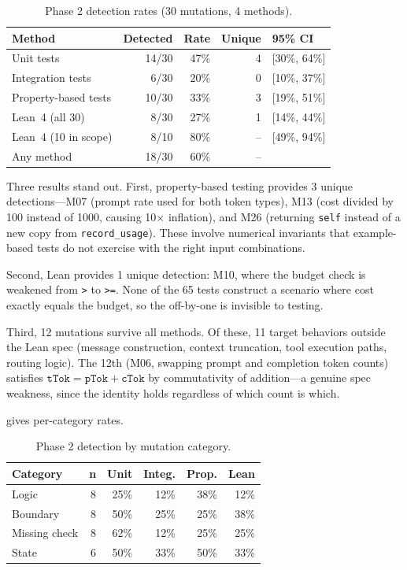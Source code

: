 \documentclass[11pt,a4paper]{article}
\begin{document}
\begin{table}[htbp]
\centering
\caption{Phase 2 detection rates (30 mutations, 4 methods).}
\label{tab:phase2}
\small
\begin{tabular}{@{}lrrrl@{}}
\toprule
\textbf{Method} & \textbf{Detected} & \textbf{Rate} & \textbf{Unique} & \textbf{95\% CI} \\
\midrule
Unit tests & 14/30 & 47\% & 4 & [30\%, 64\%] \\
Integration tests & 6/30 & 20\% & 0 & [10\%, 37\%] \\
Property-based tests & 10/30 & 33\% & 3 & [19\%, 51\%] \\
Lean~4 (all 30) & 8/30 & 27\% & 1 & [14\%, 44\%] \\
Lean~4 (10 in scope) & 8/10 & 80\% & -- & [49\%, 94\%] \\
\midrule
Any method & 18/30 & 60\% & -- & \\
\bottomrule
\end{tabular}
\end{table}

Three results stand out. First, property-based testing provides
3 unique detections---M07 (prompt rate used for both token types),
M13 (cost divided by 100 instead of 1000, causing 10$\times$
inflation), and M26 (returning \texttt{self} instead of a new copy
from \texttt{record\_usage}). These involve numerical invariants
that example-based tests do not exercise with the right input
combinations.

Second, Lean provides 1 unique detection: M10, where the budget
check is weakened from \texttt{>} to \texttt{>=}. None of the
65 tests construct a scenario where cost exactly equals the budget,
so the off-by-one is invisible to testing.

Third, 12 mutations survive all methods. Of these, 11 target
behaviors outside the Lean spec (message construction, context
truncation, tool execution paths, routing logic). The 12th (M06,
swapping prompt and completion token counts) satisfies
$\texttt{tTok} = \texttt{pTok} + \texttt{cTok}$ by commutativity
of addition---a genuine spec weakness, since the identity holds
regardless of which count is which.

 gives per-category rates.

\begin{table}[htbp]
\centering
\caption{Phase 2 detection by mutation category.}
\label{tab:categories}
\small
\begin{tabular}{@{}lrrrrr@{}}
\toprule
\textbf{Category} & \textbf{n} & \textbf{Unit} & \textbf{Integ.} & \textbf{Prop.} & \textbf{Lean} \\
\midrule
Logic & 8 & 25\% & 12\% & 38\% & 12\% \\
Boundary & 8 & 50\% & 25\% & 25\% & 38\% \\
Missing check & 8 & 62\% & 12\% & 25\% & 25\% \\
State & 6 & 50\% & 33\% & 50\% & 33\% \\
\bottomrule
\end{tabular}
\end{table}
\end{document}
